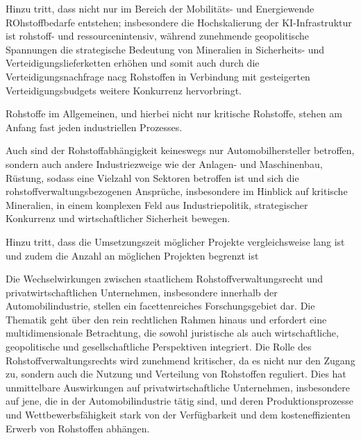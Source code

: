 \documentclass[12pt,a4paper,oneside]{book} %
\begin{document}
	Hinzu tritt, dass nicht nur im Bereich der Mobilitäts- und Energiewende ROhstoffbedarfe entstehen; insbesondere die Hochskalierung der KI-Infrastruktur ist rohstoff- und ressourcenintensiv, während zunehmende geopolitische Spannungen die strategische Bedeutung von Mineralien in Sicherheits- und Verteidigungslieferketten erhöhen und somit auch durch die Verteidigungsnachfrage nacg Rohstoffen in Verbindung mit gesteigerten Verteidigungsbudgets weitere Konkurrenz hervorbringt.
	
	Rohstoffe im Allgemeinen, und hierbei nicht nur kritische Rohstoffe, stehen am Anfang fast jeden industriellen Prozesses.
	
	Auch sind der Rohstoffabhängigkeit keineswegs nur Automobilhersteller betroffen, sondern auch andere Industriezweige wie der Anlagen- und Maschinenbau, Rüstung, sodass  eine Vielzahl von Sektoren betroffen ist und sich die rohstoffverwaltungsbezogenen Ansprüche, insbesondere im Hinblick auf kritische Mineralien, in einem komplexen Feld aus Industriepolitik, strategischer Konkurrenz und wirtschaftlicher Sicherheit bewegen.
	
	Hinzu tritt, dass die Umsetzungszeit möglicher Projekte vergleichsweise lang ist und zudem die Anzahl an möglichen Projekten begrenzt ist
	
	Die Wechselwirkungen zwischen staatlichem Rohstoffverwaltungsrecht und privatwirtschaftlichen Unternehmen, insbesondere innerhalb der Automobilindustrie, stellen ein facettenreiches Forschungsgebiet dar. Die Thematik geht über den rein rechtlichen Rahmen hinaus und erfordert eine multidimensionale Betrachtung, die sowohl juristische als auch wirtschaftliche, geopolitische und gesellschaftliche Perspektiven integriert. Die Rolle des Rohstoffverwaltungsrechts wird zunehmend kritischer, da es nicht nur den Zugang zu, sondern auch die Nutzung und Verteilung von Rohstoffen reguliert. Dies hat unmittelbare Auswirkungen auf privatwirtschaftliche Unternehmen, insbesondere auf jene, die in der Automobilindustrie tätig sind, und deren Produktionsprozesse und Wettbewerbsfähigkeit stark von der Verfügbarkeit und dem kosteneffizienten Erwerb von Rohstoffen abhängen.
	
\end{document}
